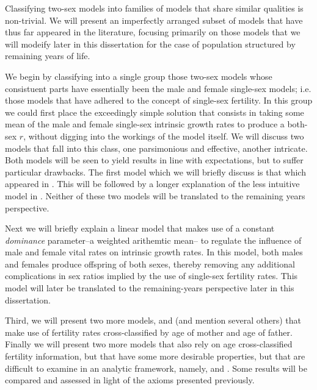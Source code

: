 Classifying two-sex models into families of models that share similar qualities
is non-trivial. We will present an imperfectly arranged subset of models that
have thus far appeared in the literature, focusing primarily on those models
that we will modeify later in this dissertation for the case of
population structured by remaining years of life. 

We begin by classifying into a single group those two-sex models whose
consistuent parts have essentially been the male and female single-sex models; i.e. those
models that have adhered to the concept of single-sex fertility. In this group
we could first place the exceedingly simple solution that consists in taking some 
mean of the male and female single-sex intrinsic growth rates to produce a 
both-sex $r$, without digging into the workings of the model
itself\citep[e.g.][]{kuczynski1932fertility}. We will discuss two models that
fall into this class, one parsimonious and effective, another intricate. Both
models will be seen to yield results in line with expectations, but to suffer
particular drawbacks. The first model which we will briefly discuss is that
which appeared in \citet{pollard1948measurement}. This will be followed by
a longer explanation of the less intuitive model in \citet{mitra1978derivation}.
Neither of these two models will be translated to the remaining years
perspective.

Next we will briefly explain a linear model that makes use of a constant
\textit{dominance} parameter--a weighted arithemtic mean-- to regulate the
influence of male and female vital rates on intrinsic growth rates. In this
model, both males and females produce offspring of both sexes, thereby
removing any additional complications in sex ratios implied by the use of
single-sex fertility rates. This model will later be translated to the
remaining-years perspective later in this dissertation.

Third, we will present two more models, \citet{gupta1978alternative} and
\citet{schoen1981harmonic} (and mention several others) that make use of
fertility rates cross-classified by age of mother and age of father. Finally 
we will present two more models that also rely on age
cross-classified fertility information, but that have some more desirable
properties, but that are difficult to examine in an analytic framework, namely,
\citet{henry1972nuptiality} and \citet{mc1975models}. Some
results will be compared and assessed in light of the axioms presented
previously.

 
 
 
 
 
\FloatBarrier